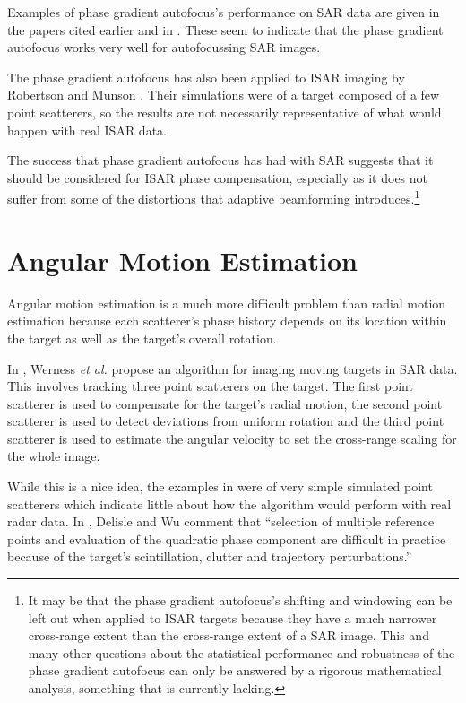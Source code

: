 Examples of phase gradient autofocus's performance on SAR data are given in
the papers cited earlier and in \cite{Wah94}.  These seem to indicate that
the phase gradient autofocus works very well for autofocussing SAR images.

The phase gradient autofocus has also been applied to ISAR imaging by
Robertson and Munson \cite{Rob93}.  Their simulations were of a target 
composed of a few point scatterers, so the results are not necessarily
representative of what would happen with real ISAR data.  

The success that phase gradient autofocus has had with SAR suggests that it
should be considered for ISAR phase compensation, especially as it does not
suffer from some of the distortions that adaptive beamforming
introduces.\footnote{It may be that the phase gradient autofocus's shifting
and windowing can be left out when applied to ISAR targets because they
have a much narrower cross-range extent than the cross-range extent of a
SAR image.  This and many other questions about the statistical performance
and robustness of the phase gradient autofocus can only be answered by a
rigorous mathematical analysis, something that is currently lacking.}

\section{Angular Motion Estimation}

Angular motion estimation is a much more difficult problem than radial
motion estimation because each scatterer's phase history depends on its
location within the target as well as the target's overall rotation.

In \cite{Wer90}, Werness {\em et al.\/} propose an algorithm for imaging
moving targets in SAR data.  This involves tracking three point scatterers
on the target.  The first point scatterer is used to compensate for the
target's radial motion, the second point scatterer is used to detect
deviations from uniform rotation and the third point scatterer is used to
estimate the angular velocity to set the cross-range scaling for the whole
image.

While this is a nice idea, the examples in \cite{Wer90} were of very simple
simulated point scatterers which indicate little about how the algorithm
would perform with real radar data.  In \cite{Del94}, Delisle and Wu comment
that ``selection of multiple reference points and evaluation of the
quadratic phase component are difficult in practice because of the target's
scintillation, clutter and trajectory perturbations.'' 

